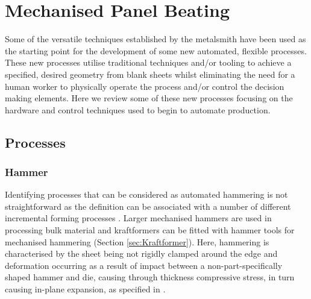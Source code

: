 


\newpage
\section{Mechanised Panel Beating} \label{sec:Mechanised}

Some of the versatile techniques established by the metalsmith have been used as the starting point for the development of some new automated, flexible processes. These new processes utilise traditional techniques and/or tooling to achieve a specified, desired geometry from blank sheets whilst eliminating the need for a human worker to physically operate the process and/or control the decision making elements.  Here we review some of these new processes focusing on the hardware and control techniques used to begin to automate production.

\subsection{Processes} \label{sec:MechanisedProcess}
\subsubsection*{Hammer}
Identifying processes that can be considered as automated hammering is not straightforward as the definition can be associated with a number of different incremental forming processes \citep{Emmens2010TheHistory}. Larger mechanised hammers are used in processing bulk material \citep{Lange1986HandbookForming} and kraftformers can be fitted with hammer tools for mechanised hammering (Section \ref{sec:Kraftformer}). Here, hammering is characterised by the sheet being not rigidly clamped around the edge and deformation occurring as a result of impact between a non-part-specifically shaped hammer and die, causing through thickness compressive stress, in turn causing in-plane expansion, as specified in \citep{Allwood2006AJapan}.


